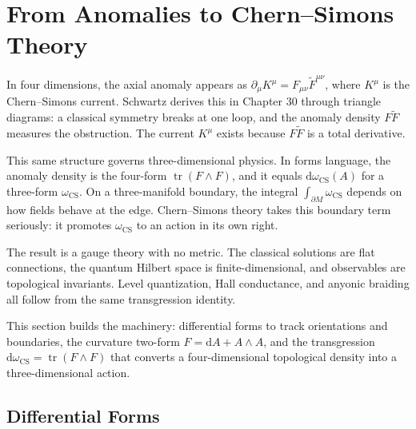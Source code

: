 
\providecommand{\dd}{\mathrm{d}}
\providecommand{\Tr}{\operatorname{Tr}}
\providecommand{\tr}{\operatorname{tr}}
\providecommand{\CS}{\operatorname{CS}}
\providecommand{\Hom}{\operatorname{Hom}}
\providecommand{\Lie}{\operatorname{Lie}}
\providecommand{\id}{\operatorname{id}}

\section{From Anomalies to Chern--Simons Theory}
\label{sec:forms-cs-foundations}

In four dimensions, the axial anomaly appears as $\partial_\mu K^\mu = F_{\mu\nu}\widetilde F^{\mu\nu}$, where $K^\mu$ is the Chern--Simons current. Schwartz derives this in Chapter 30 through triangle diagrams: a classical symmetry breaks at one loop, and the  anomaly density $F\widetilde F$ measures the obstruction. The current $K^\mu$ exists because $F\widetilde F$ is a total derivative.

This same structure governs three-dimensional physics. In forms language, the anomaly density is the four-form $\tr(F\wedge F)$, and it equals $\dd\omega_{\CS}(A)$ for a three-form $\omega_{\CS}$. On a three-manifold boundary, the integral $\int_{\partial M}\omega_{\CS}$ depends on how fields behave at the edge. Chern--Simons theory takes this boundary term seriously: it promotes $\omega_{\CS}$ to an action in its own right.

The result is a gauge theory with no metric. The classical solutions are flat connections, the quantum Hilbert space is finite-dimensional, and observables are topological invariants. Level quantization, Hall conductance, and anyonic braiding all follow from the same transgression identity.

This section builds the machinery: differential forms to track orientations and boundaries, the curvature two-form $F=\dd A+A\wedge A$, and the transgression $\dd\omega_{\CS}=\tr(F\wedge F)$ that converts a four-dimensional topological density into a three-dimensional action.

\subsection{Differential Forms}
\label{subsec:forms-toolkit}

